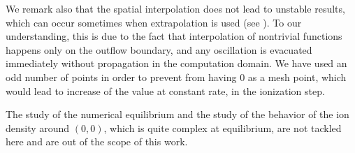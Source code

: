 \documentclass{article}
\numberwithin{equation}{section}
\begin{document}
%
%
%
%

We remark also that the spatial interpolation does not lead to unstable results, which can occur sometimes when extrapolation is used (see \cite{badsiNumericalStabilityPlasma2018}). 
To our understanding, this is due to the fact that interpolation of nontrivial functions happens only on the outflow boundary, and any oscillation is evacuated immediately without propagation in the computation domain. 
We have used an odd number of points in order to prevent from having $0$ as a mesh point, which would lead to increase of the value at constant rate, in the ionization step.

The study of the numerical equilibrium and the study of the behavior of the ion density around $(0,0)$, which is quite complex at equilibrium, are not tackled here and are out of the scope of this work.
\end{document}

